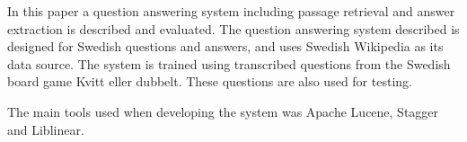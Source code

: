 In this paper a question answering system including passage retrieval and answer 
extraction is described and evaluated.
The question answering system described is designed for Swedish questions and answers, and 
uses Swedish Wikipedia as its data source. The system is trained using transcribed 
questions from the Swedish board game Kvitt eller dubbelt. These questions are also used 
for testing.

The main tools used when developing the system was Apache Lucene, Stagger and Liblinear.
